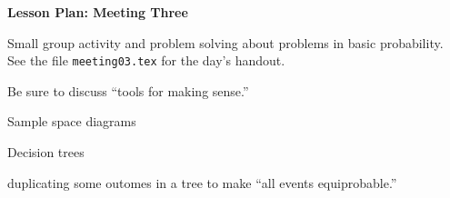 \documentclass[12pt]{amsart}
\theoremstyle{definition}
\begin{document}
\begin{center}
\textbf{\Huge
Lesson Plan: Meeting Three
}
\end{center}
\vspace{.5in}

Small group activity and problem solving about problems in basic probability. See the file \texttt{meeting03.tex} for the day's handout.

Be sure to discuss ``tools for making sense.''
\begin{compactitem}
\item Sample space diagrams

\item Decision trees

\item duplicating some outomes in a tree to make ``all events equiprobable.''
\end{compactitem}
\end{document}
